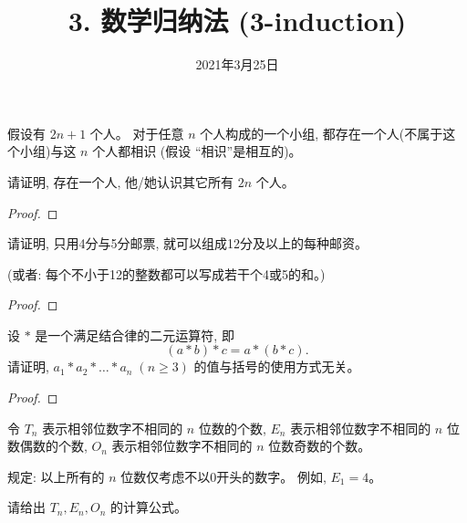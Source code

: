 \documentclass[a4paper, justified]{tufte-handout}
\title{3. 数学归纳法 (3-induction)}
\date{2021年3月25日}
\begin{document}
\maketitle
\noplagiarism %
\begin{abstract}
\end{abstract}
\beginrequired

\begin{problem}
  假设有 $2n + 1$ 个人。
  对于任意 $n$ 个人构成的一个小组,
  都存在一个人(不属于这个小组)与这 $n$ 个人都相识 (假设 ``相识''是相互的)。

  \noindent 请证明, 存在一个人, 他/她认识其它所有 $2n$ 个人。
\end{problem}

\begin{proof}
\end{proof}

\begin{problem}
  请证明, 只用4分与5分邮票, 就可以组成12分及以上的每种邮资。

  \noindent (或者: 每个不小于12的整数都可以写成若干个4或5的和。)
\end{problem}

\begin{proof}
\end{proof}

\begin{problem}
  设 $\ast$ 是一个满足结合律的二元运算符, 即
  \[
    (a \ast b) \ast c = a \ast (b \ast c).
  \]
  请证明, $a_{1} \ast a_{2} \ast \dots \ast a_{n}\; (n \ge 3)$
  的值与括号的使用方式无关。
\end{problem}

\begin{proof}
\end{proof}

\begin{problem}
  令 $T_{n}$ 表示相邻位数字不相同的 $n$ 位数的个数,
  $E_{n}$ 表示相邻位数字不相同的 $n$ 位数偶数的个数,
  $O_{n}$ 表示相邻位数字不相同的 $n$ 位数奇数的个数。

  \noindent 规定: 以上所有的 $n$ 位数仅考虑不以0开头的数字。
  例如, $E_{1} = 4$。

  \noindent 请给出 $T_{n}, E_{n}, O_{n}$ 的计算公式。
\end{problem}
\end{document}
